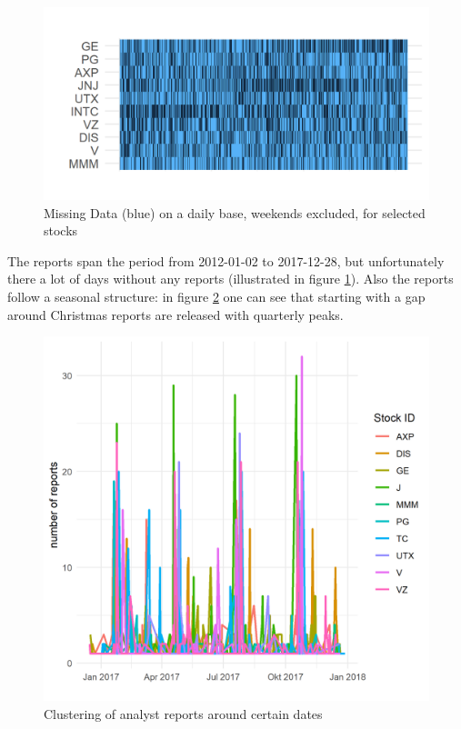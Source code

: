\begin{figure}[h!]
\centering
\includegraphics[width=\textwidth]{figures/MissingDaysPlot.png}
\caption{Missing Data (blue) on a daily base, weekends excluded, for selected stocks}
\label{fig:MissingDays}
\end{figure}
The reports span the period from 2012-01-02 to 2017-12-28, but unfortunately there a lot of days without any reports (illustrated in figure \ref{fig:MissingDays}). Also the reports follow a seasonal structure: in figure \ref{fig:ClusterReport} one can see that starting with a gap around Christmas reports are released with quarterly peaks.

\begin{figure}[h!]
\centering
\includegraphics[width=\textwidth]{figures/SeasonalityReports.png}
\caption{Clustering of analyst reports around certain dates}
\label{fig:ClusterReport}
\end{figure}

